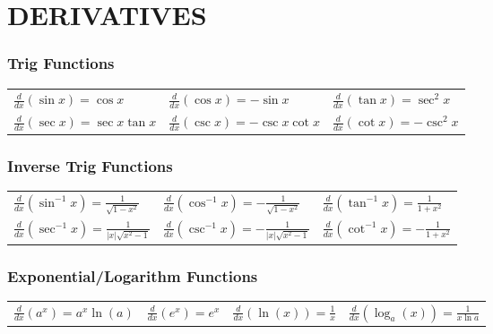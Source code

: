 \section{DERIVATIVES}

\subsubsection{Trig Functions}

\begin{tabular}{m{5cm} m{5cm} m}
   $\frac{d}{d x}(\sin x)=\cos x$ & $\frac{d}{d x}(\cos x)=-\sin x$ & $\frac{d}{d x}(\tan x)=\sec ^2 x$ \\
   $\frac{d}{d x}(\sec x)=\sec x \tan x$  & $\frac{d}{d x}(\csc x)=-\csc x \cot x$ & $\frac{d}{d x}(\cot x)=-\csc ^2 x$
\end{tabular}

\subsubsection{Inverse Trig Functions}

\begin{tabular}{m{5cm} m{5cm} m}
    $\frac{d}{d x}\left(\sin ^{-1} x\right)=\frac{1}{\sqrt{1-x^2}}$ & $\frac{d}{d x}\left(\cos ^{-1} x\right)=-\frac{1}{\sqrt{1-x^2}}$ & $\frac{d}{d x}\left(\tan ^{-1} x\right)=\frac{1}{1+x^2}$ \\
    $\frac{d}{d x}\left(\sec ^{-1} x\right)=\frac{1}{|x| \sqrt{x^2-1}}$ & $\frac{d}{d x}\left(\csc ^{-1} x\right)=-\frac{1}{|x| \sqrt{x^2-1}}$ & $\frac{d}{d x}\left(\cot ^{-1} x\right)=-\frac{1}{1+x^2}$
\end{tabular}

\subsubsection{Exponential/Logarithm Functions}

\begin{tabular}{m{3.5cm} m{3.5cm} m{3.5cm} m}
    $\frac{d}{d x}\left(a^x\right)=a^x \ln (a)$ & $\frac{d}{d x}\left(e^x\right)=e^x$ & $\frac{d}{d x}(\ln (x))=\frac{1}{x}$ & $\frac{d}{d x}\left(\log _a(x)\right)=\frac{1}{x \ln a}$
\end{tabular}